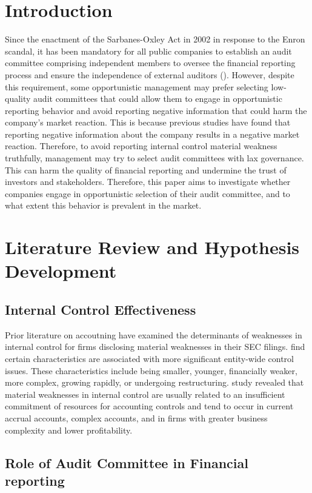 \documentclass[12pt,english]{article}
\begin{document}
\section{Introduction}\label{sec:intro}
Since the enactment of the Sarbanes-Oxley Act in 2002 in response to the Enron scandal, it has been mandatory for all public companies to establish an audit committee comprising independent members to oversee the financial reporting process and ensure the independence of external auditors (\citet{cth2019}). However, despite this requirement, some opportunistic management may prefer selecting low-quality audit committees that could allow them to engage in opportunistic reporting behavior and avoid reporting negative information that could harm the company's market reaction. This is because previous studies have found that reporting negative information about the company results in a negative market reaction. Therefore, to avoid reporting internal control material weakness truthfully, management may try to select audit committees with lax governance. This can harm the quality of financial reporting and undermine the trust of investors and stakeholders. Therefore, this paper aims to investigate whether companies engage in opportunistic selection of their audit committee, and to what extent this behavior is prevalent in the market.

\section{Literature Review and Hypothesis Development}\label{sec:litreview}
\subsection{Internal Control Effectiveness}
Prior literature on accoutning have examined the determinants of weaknesses in internal control for firms disclosing material weaknesses in their SEC filings. \citet{dgm2007} find certain characteristics are associated with more significant entity-wide control issues. These characteristics include being smaller, younger, financially weaker, more complex, growing rapidly, or undergoing restructuring. \citet{gm2005} study revealed that material weaknesses in internal control are usually related to an insufficient commitment of resources for accounting controls and tend to occur in current accrual accounts, complex accounts, and in firms with greater business complexity and lower profitability.

\subsection{Role of Audit Committee in Financial reporting}
\end{document}
